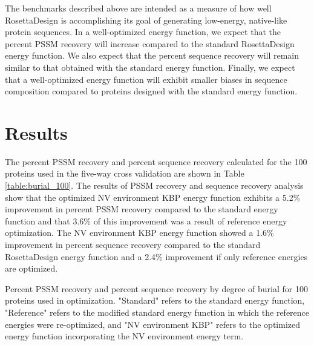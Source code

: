 The benchmarks described above are intended as a measure of how well RosettaDesign is accomplishing its goal of generating low-energy, native-like protein sequences.
In a well-optimized energy function, we expect that the percent \ac{PSSM} recovery will increase compared to the standard RosettaDesign energy function.
We also expect that the percent sequence recovery will remain similar to that obtained with the standard energy function.
Finally, we expect that a well-optimized energy function will exhibit smaller biases in sequence composition compared to proteins designed with the standard energy function.

\section{Results}

The percent \ac{PSSM} recovery and percent sequence recovery calculated for the 100 proteins used in the five-way cross validation are shown in Table \ref{table:burial_100}.
The results of \ac{PSSM} recovery and sequence recovery analysis show that the optimized \ac{NV} environment \ac{KBP} energy function exhibits a 5.2\% improvement in percent \ac{PSSM} recovery compared to the standard energy function and that 3.6\% of this improvement was a result of reference energy optimization.
The \ac{NV} environment \ac{KBP} energy function showed a 1.6\% improvement in percent sequence recovery compared to the standard RosettaDesign energy function and a 2.4\% improvement if only reference energies are optimized.  

\begin{table}
\scriptsize
\renewcommand{\tabcolsep}{0.09cm}
\centering

\caption{Percent \acs{PSSM} recovery and percent sequence recovery by degree of burial for 100 proteins used in optimization. "Standard" refers to the standard energy function, "Reference" refers to the modified standard energy function in which the reference energies were re-optimized, and "\acs{NV} environment \acs{KBP}" refers to the optimized energy function incorporating the \acs{NV} environment energy term.}
\label{table:burial_100}
\end{table}

